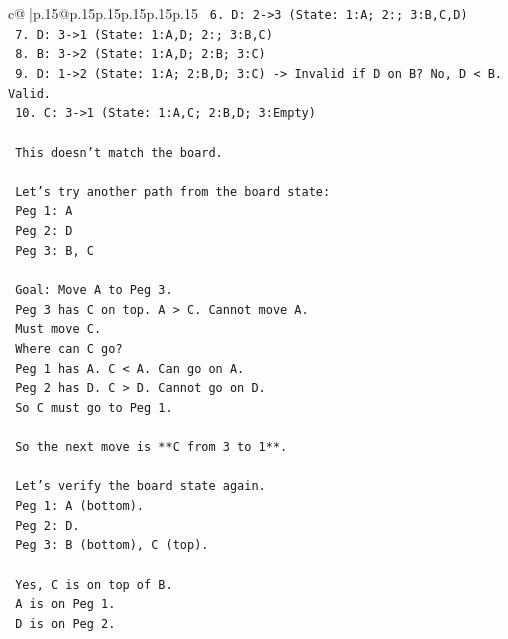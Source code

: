 \documentclass{article}
\begin{document}
{\begin{supertabular}{c@{$\;$}|p{.15\linewidth}@{}p{.15\linewidth}p{.15\linewidth}p{.15\linewidth}p{.15\linewidth}p{.15\linewidth}}
{{{\texttt{            6. D: 2{-}>3 (State: 1:A; 2:; 3:B,C,D)} \\
\texttt{            7. D: 3{-}>1 (State: 1:A,D; 2:; 3:B,C)} \\
\texttt{            8. B: 3{-}>2 (State: 1:A,D; 2:B; 3:C)} \\
\texttt{            9. D: 1{-}>2 (State: 1:A; 2:B,D; 3:C) {-}> Invalid if D on B? No, D < B. Valid.} \\
\texttt{            10. C: 3{-}>1 (State: 1:A,C; 2:B,D; 3:Empty)} \\
\\ 
\texttt{            This doesn't match the board.} \\
\\ 
\texttt{            Let's try another path from the board state:} \\
\texttt{            Peg 1: A} \\
\texttt{            Peg 2: D} \\
\texttt{            Peg 3: B, C} \\
\\ 
\texttt{            Goal: Move A to Peg 3.} \\
\texttt{            Peg 3 has C on top. A > C. Cannot move A.} \\
\texttt{            Must move C.} \\
\texttt{            Where can C go?} \\
\texttt{            Peg 1 has A. C < A. Can go on A.} \\
\texttt{            Peg 2 has D. C > D. Cannot go on D.} \\
\texttt{            So C must go to Peg 1.} \\
\\ 
\texttt{            So the next move is **C from 3 to 1**.} \\
\\ 
\texttt{            Let's verify the board state again.} \\
\texttt{            Peg 1: A (bottom).} \\
\texttt{            Peg 2: D.} \\
\texttt{            Peg 3: B (bottom), C (top).} \\
\\ 
\texttt{            Yes, C is on top of B.} \\
\texttt{            A is on Peg 1.} \\
\texttt{            D is on Peg 2.} \\
\\ 
}}}
\end{supertabular}}
\end{document}
